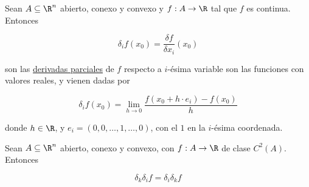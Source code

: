 \begin{defn}
    Sean $A \subseteq \R^n$ abierto, conexo y convexo y $f: A \rightarrow \R$ tal que $f$ es continua. Entonces
    
    \[
    \delta_i f(x_0) = \frac{\delta f}{\delta x_i}(x_0)
    \]
    
    \noindent son las \ul{derivadas parciales} de $f$ respecto a $i$-ésima variable son las funciones con valores reales, y vienen dadas por
    
    \[
    \delta_i f(x_0) = \lim_{h \to 0} \frac{f(x_0 + h \cdot e_i) - f(x_0)}{h}
    \]
    
    \noindent donde $h \in \R$, y $e_i = (0, 0, \dots, 1, \dots, 0)$, con el $1$ en la $i$-ésima coordenada.
\end{defn}

\begin{teo}
    Sean $A \subseteq \R^n$ abierto, conexo y convexo, con $f: A \rightarrow \R$ de clase $C^2(A)$. Entonces
    
    \[
    \delta_k\delta_if = \delta_i\delta_kf
    \]
\end{teo}

